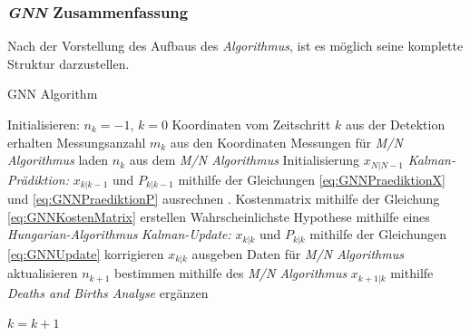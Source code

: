 \documentclass[10pt,a4paper]{article}
\begin{document}
\subsubsection{\textit{GNN} Zusammenfassung}
Nach der Vorstellung des Aufbaus des \textit{Algorithmus}, ist es möglich seine komplette Struktur darzustellen.\\
\begin{algorithm}
\caption{GNN Algorithm}
\label{alg:GNNAlgorithm}
\begin{algorithmic}[1]
\State Initialisieren: $n_k = -1$, $k = 0$
  \State Koordinaten vom Zeitschritt $k$ aus der Detektion erhalten
  \State Messungsanzahl $m_k$ aus den Koordinaten
  \State Messungen für \textit{M/N Algorithmus} laden
  \EndIf
  \State $n_k$ aus dem \textit{M/N Algorithmus}
  \State Initialisierung $x_{N|N-1}$
  \EndIf
          \State \textit{Kalman-Prädiktion: }$x_{k|k-1}$ und $P_{k|k-1}$  mithilfe der Gleichungen  \ref{eq:GNNPraediktionX} und                 \ref{eq:GNNPraediktionP} ausrechnen .
          \State Kostenmatrix mithilfe der Gleichung \eqref{eq:GNNKostenMatrix} erstellen 
          \State Wahrscheinlichste Hypothese mithilfe eines \textit{Hungarian-Algorithmus}
          \State \textit{Kalman-Update: }$x_{k|k}$ und $P_{k|k}$ mithilfe der Gleichungen \ref{eq:GNNUpdate} korrigieren
          \State $x_{k|k}$ ausgeben
      \EndFor
      \State Daten für \textit{M/N Algorithmus} aktualisieren
      \State $n_{k+1}$ bestimmen mithilfe des  \textit{M/N Algorithmus}
      \State $x_{k+1|k}$ mithilfe \textit{Deaths and Births Analyse} ergänzen
      
  \EndIf
  $k = k+1$
\EndWhile


\end{algorithmic}
\end{algorithm}
\end{document}
